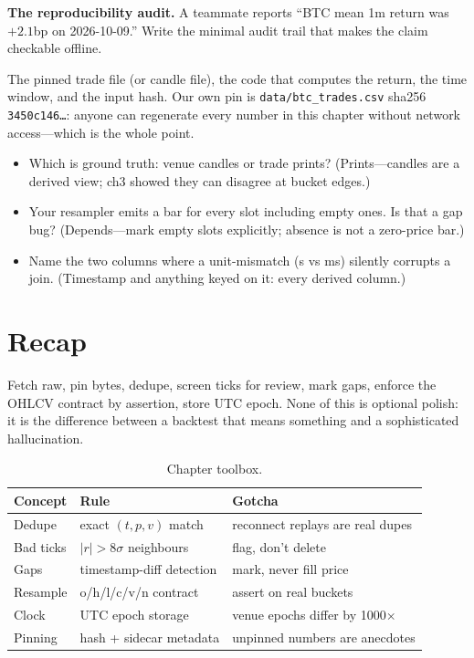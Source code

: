 \begin{example}\label{ex:pin}
\textbf{The reproducibility audit.} A teammate reports ``BTC mean 1m return was $+2.1$bp on
2026-10-09.'' Write the minimal audit trail that makes the claim checkable offline.
\begin{solution}
The pinned trade file (or candle file), the code that computes the return, the time window,
and the input hash. Our own pin is \texttt{data/btc\_trades.csv} sha256
\texttt{3450c146\ldots}: anyone can regenerate every number in this chapter without network
access---which is the whole point.
\end{solution}
\end{example}

\begin{checkpoint}
\begin{itemize}
\item Which is ground truth: venue candles or trade prints? (Prints---candles are a derived
view; ch3 showed they can disagree at bucket edges.)
\item Your resampler emits a bar for every slot including empty ones. Is that a gap bug?
(Depends---mark empty slots explicitly; absence is not a zero-price bar.)
\item Name the two columns where a unit-mismatch (s vs ms) silently corrupts a join.
(Timestamp and anything keyed on it: every derived column.)
\end{itemize}
\end{checkpoint}

\section{Recap}\label{sec:datarecap}

Fetch raw, pin bytes, dedupe, screen ticks for review, mark gaps, enforce the OHLCV contract
by assertion, store UTC epoch. None of this is optional polish: it is the difference between
a backtest that means something and a sophisticated hallucination.

\begin{table}[htbp]\centering\small
\caption{Chapter toolbox.}
\begin{tabular}{@{}lll@{}}
\toprule
Concept & Rule & Gotcha\\
\midrule
Dedupe & exact $(t,p,v)$ match & reconnect replays are real dupes\\
Bad ticks & $|r|>8\sigma$ neighbours & flag, don't delete\\
Gaps & timestamp-diff detection & mark, never fill price\\
Resample & o/h/l/c/v/n contract & assert on real buckets\\
Clock & UTC epoch storage & venue epochs differ by 1000$\times$\\
Pinning & hash + sidecar metadata & unpinned numbers are anecdotes\\
\bottomrule
\end{tabular}
\end{table}


